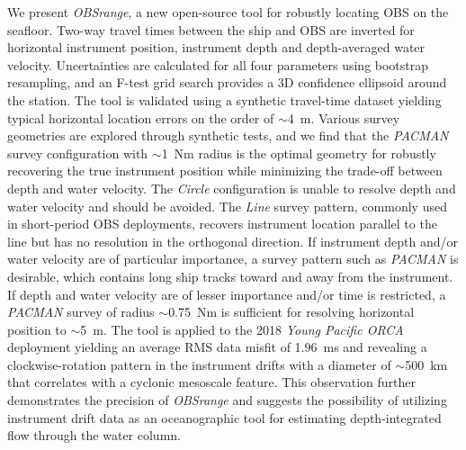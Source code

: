 We present \textit{OBSrange}, a new open-source tool for robustly locating OBS on the seafloor. Two-way travel times between the ship and OBS are inverted for horizontal instrument position, instrument depth and depth-averaged water velocity. Uncertainties are calculated for all four parameters using bootstrap resampling, and an F-test grid search provides a 3D confidence ellipsoid around the station. The tool is validated using a synthetic travel-time dataset yielding typical horizontal location errors on the order of $\sim$4~m. Various survey geometries are explored through synthetic tests, and we find that the \textit{PACMAN} survey configuration with $\sim$1~Nm radius is the optimal geometry for robustly recovering the true instrument position while minimizing the trade-off between depth and water velocity. The \textit{Circle} configuration is unable to resolve depth and water velocity and should be avoided. The \textit{Line} survey pattern, commonly used in short-period OBS deployments, recovers instrument location parallel to the line but has no resolution in the orthogonal direction. If instrument depth and/or water velocity are of particular importance, a survey pattern such as \textit{PACMAN} is desirable, which contains long ship tracks toward and away from the instrument. If depth and water velocity are of lesser importance and/or time is restricted, a \textit{PACMAN} survey of radius $\sim$0.75~Nm is sufficient for resolving horizontal position to $\sim$5~m. The tool is applied to the 2018 \textit{Young Pacific ORCA} deployment yielding an average RMS data misfit of 1.96~ms and revealing a clockwise-rotation pattern in the instrument drifts with a diameter of $\sim$500~km that correlates with a cyclonic mesoscale feature. This observation further demonstrates the precision of \textit{OBSrange} and suggests the possibility of utilizing instrument drift data as an oceanographic tool for estimating depth-integrated flow through the water column.